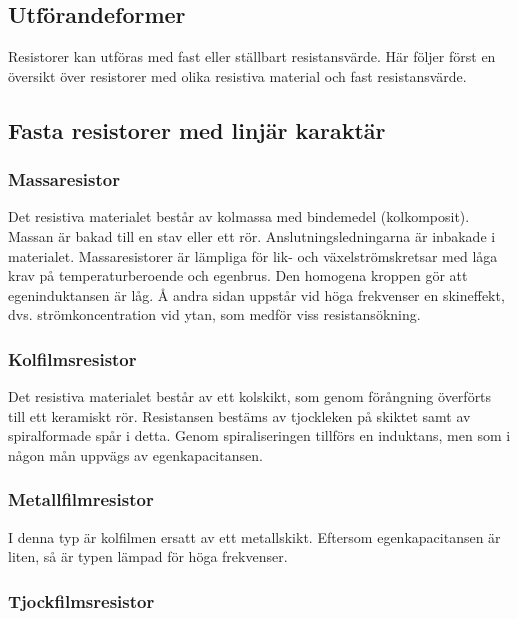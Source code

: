 \subsection{Utförandeformer}

Resistorer kan utföras med fast eller ställbart resistansvärde. Här följer
först en översikt över resistorer med olika resistiva material och fast
resistansvärde.

\subsection{Fasta resistorer med linjär karaktär}

\subsubsection{Massaresistor}

Det resistiva materialet består av kolmassa med bindemedel (kolkomposit).
Massan är bakad till en stav eller ett rör. Anslutningsledningarna är inbakade
i materialet. Massaresistorer är lämpliga för lik- och växelströmskretsar med
låga krav på temperaturberoende och egenbrus. Den homogena kroppen gör att
egeninduktansen är låg. Å andra sidan uppstår vid höga frekvenser en
skineffekt, dvs. strömkoncentration vid ytan, som medför viss resistansökning.

\subsubsection{Kolfilmsresistor}

Det resistiva materialet består av ett kolskikt, som genom förångning överförts
till ett keramiskt rör. Resistansen bestäms av tjockleken på skiktet samt av
spiralformade spår i detta. Genom spiraliseringen tillförs en induktans, men
som i någon mån uppvägs av egenkapacitansen.

\subsubsection{Metallfilmresistor}

I denna typ är kolfilmen ersatt av ett metallskikt. Eftersom egenkapacitansen
är liten, så är typen lämpad för höga frekvenser.

\subsubsection{Tjockfilmsresistor}

